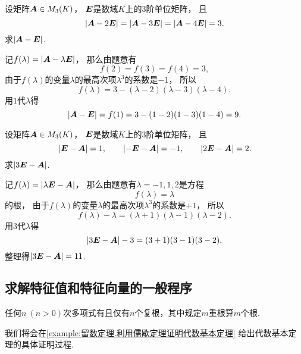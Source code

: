 \begin{example}
设矩阵\(\boldsymbol{A} \in M_3(K)\)，
\(\boldsymbol{E}\)是数域\(K\)上的3阶单位矩阵，
且\begin{equation*}
	\abs{\boldsymbol{A}-2\boldsymbol{E}}
	= \abs{\boldsymbol{A}-3\boldsymbol{E}}
	= \abs{\boldsymbol{A}-4\boldsymbol{E}}
	= 3.
\end{equation*}
求\(\abs{\boldsymbol{A}-\boldsymbol{E}}\).
\begin{solution}
记\(f(\lambda) = \abs{\boldsymbol{A}-\lambda\boldsymbol{E}}\)，
那么由题意有\begin{equation*}
	f(2) = f(3) = f(4) = 3,
\end{equation*}
由于\(f(\lambda)\)的变量\(\lambda\)的最高次项\(\lambda^3\)的系数是\(-1\)，
所以\begin{equation*}
	f(\lambda) = 3 - (\lambda-2)(\lambda-3)(\lambda-4).
\end{equation*}
用\(1\)代\(\lambda\)得\begin{equation*}
	\abs{\boldsymbol{A}-\boldsymbol{E}}
	= f(1)
	= 3 - (1-2)(1-3)(1-4)
	= 9.
\end{equation*}
\end{solution}
\end{example}
\begin{example}
设矩阵\(\boldsymbol{A} \in M_3(K)\)，
\(\boldsymbol{E}\)是数域\(K\)上的3阶单位矩阵，
且\begin{equation*}
	\abs{\boldsymbol{E}-\boldsymbol{A}} = 1,
	\qquad
	\abs{-\boldsymbol{E}-\boldsymbol{A}} = -1,
	\qquad
	\abs{2\boldsymbol{E}-\boldsymbol{A}} = 2.
\end{equation*}
求\(\abs{3\boldsymbol{E}-\boldsymbol{A}}\).
\begin{solution}
记\(f(\lambda) = \abs{\lambda\boldsymbol{E}-\boldsymbol{A}}\)，
那么由题意有\(\lambda=-1,1,2\)是方程\begin{equation*}
	f(\lambda) = \lambda
\end{equation*}的根，
由于\(f(\lambda)\)的变量\(\lambda\)的最高次项\(\lambda^3\)的系数是\(+1\)，
所以\begin{equation*}
	f(\lambda) - \lambda
	= (\lambda+1)(\lambda-1)(\lambda-2).
\end{equation*}
用\(3\)代\(\lambda\)得\begin{equation*}
	\abs{3\boldsymbol{E}-\boldsymbol{A}} - 3
	= (3+1)(3-1)(3-2),
\end{equation*}
整理得\(\abs{3\boldsymbol{E}-\boldsymbol{A}} = 11\).
\end{solution}
\end{example}

\subsection{求解特征值和特征向量的一般程序}
\begin{lemma}[代数基本定理]
任何\(n\ (n>0)\)次多项式有且仅有\(n\)个复根，其中规定\(m\)重根算\(m\)个根.
\end{lemma}
我们将会在\cref{example:留数定理.利用儒歇定理证明代数基本定理} 给出代数基本定理的具体证明过程.

